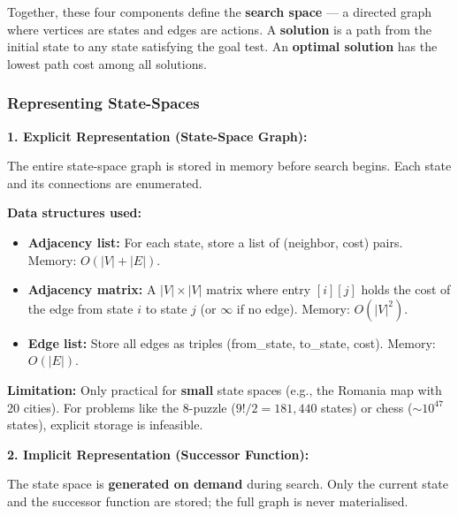 \documentclass[12pt, a4paper]{article}
\begin{document}
\noindent Together, these four components define the \textbf{search space} — a directed graph where vertices are states and edges are actions. A \textbf{solution} is a path from the initial state to any state satisfying the goal test. An \textbf{optimal solution} has the lowest path cost among all solutions.

\subsubsection*{Representing State-Spaces}

\noindent\textbf{1. Explicit Representation (State-Space Graph):}

The entire state-space graph is stored in memory before search begins. Each state and its connections are enumerated.

\textbf{Data structures used:}
\begin{itemize}[noitemsep]
  \item \textbf{Adjacency list:} For each state, store a list of (neighbor, cost) pairs. Memory: $O(|V| + |E|)$.
  \item \textbf{Adjacency matrix:} A $|V| \times |V|$ matrix where entry $[i][j]$ holds the cost of the edge from state $i$ to state $j$ (or $\infty$ if no edge). Memory: $O(|V|^2)$.
  \item \textbf{Edge list:} Store all edges as triples (from\_state, to\_state, cost). Memory: $O(|E|)$.
\end{itemize}

\noindent\textbf{Limitation:} Only practical for \textbf{small} state spaces (e.g., the Romania map with 20 cities). For problems like the 8-puzzle ($9!/2 = 181{,}440$ states) or chess ($\sim 10^{47}$ states), explicit storage is infeasible.

\vspace{0.4em}

\noindent\textbf{2. Implicit Representation (Successor Function):}

The state space is \textbf{generated on demand} during search. Only the current state and the successor function are stored; the full graph is never materialised.
\end{document}

